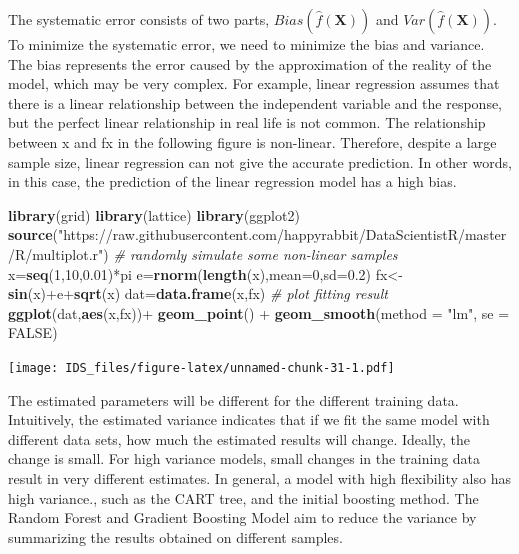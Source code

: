 \documentclass[12pt,]{krantz}
\newenvironment{Shaded}{\begin{snugshade}}{\end{snugshade}}
\newcommand{\KeywordTok}[1]{\textcolor[rgb]{0.13,0.29,0.53}{\textbf{{#1}}}}
\newcommand{\DataTypeTok}[1]{\textcolor[rgb]{0.13,0.29,0.53}{{#1}}}
\newcommand{\DecValTok}[1]{\textcolor[rgb]{0.00,0.00,0.81}{{#1}}}
\newcommand{\FloatTok}[1]{\textcolor[rgb]{0.00,0.00,0.81}{{#1}}}
\newcommand{\StringTok}[1]{\textcolor[rgb]{0.31,0.60,0.02}{{#1}}}
\newcommand{\CommentTok}[1]{\textcolor[rgb]{0.56,0.35,0.01}{\textit{{#1}}}}
\newcommand{\OtherTok}[1]{\textcolor[rgb]{0.56,0.35,0.01}{{#1}}}
\newcommand{\NormalTok}[1]{{#1}}
\theoremstyle{definition}
\theoremstyle{definition}
\theoremstyle{remark}
\begin{document}
The systematic error consists of two parts,
\(Bias(\hat{f}(\mathbf{X}))\) and \(Var (\hat{f}(\mathbf{X}))\). To
minimize the systematic error, we need to minimize the bias and
variance. The bias represents the error caused by the approximation of
the reality of the model, which may be very complex. For example, linear
regression assumes that there is a linear relationship between the
independent variable and the response, but the perfect linear
relationship in real life is not common. The relationship between x and
fx in the following figure is non-linear. Therefore, despite a large
sample size, linear regression can not give the accurate prediction. In
other words, in this case, the prediction of the linear regression model
has a high bias.

\begin{Shaded}
\begin{Highlighting}[]
\KeywordTok{library}\NormalTok{(grid)}
\KeywordTok{library}\NormalTok{(lattice)}
\KeywordTok{library}\NormalTok{(ggplot2)}
\KeywordTok{source}\NormalTok{(}\StringTok{"https://raw.githubusercontent.com/happyrabbit/DataScientistR/master/R/multiplot.r"}\NormalTok{)}
\CommentTok{# randomly simulate some non-linear samples}
\NormalTok{x=}\KeywordTok{seq}\NormalTok{(}\DecValTok{1}\NormalTok{,}\DecValTok{10}\NormalTok{,}\FloatTok{0.01}\NormalTok{)*pi}
\NormalTok{e=}\KeywordTok{rnorm}\NormalTok{(}\KeywordTok{length}\NormalTok{(x),}\DataTypeTok{mean=}\DecValTok{0}\NormalTok{,}\DataTypeTok{sd=}\FloatTok{0.2}\NormalTok{)}
\NormalTok{fx<-}\KeywordTok{sin}\NormalTok{(x)+e+}\KeywordTok{sqrt}\NormalTok{(x)}
\NormalTok{dat=}\KeywordTok{data.frame}\NormalTok{(x,fx)}
\CommentTok{# plot fitting result}
\KeywordTok{ggplot}\NormalTok{(dat,}\KeywordTok{aes}\NormalTok{(x,fx))+}\StringTok{ }
\StringTok{  }\KeywordTok{geom_point}\NormalTok{() +}
\StringTok{  }\KeywordTok{geom_smooth}\NormalTok{(}\DataTypeTok{method =} \StringTok{"lm"}\NormalTok{, }\DataTypeTok{se =} \OtherTok{FALSE}\NormalTok{)}
\end{Highlighting}
\end{Shaded}

\texttt{[image: IDS\_files/figure-latex/unnamed-chunk-31-1.pdf]}

The estimated parameters will be different for the different training
data. Intuitively, the estimated variance indicates that if we fit the
same model with different data sets, how much the estimated results will
change. Ideally, the change is small. For high variance models, small
changes in the training data result in very different estimates. In
general, a model with high flexibility also has high variance., such as
the CART tree, and the initial boosting method. The Random Forest and
Gradient Boosting Model aim to reduce the variance by summarizing the
results obtained on different samples.
\end{document}
